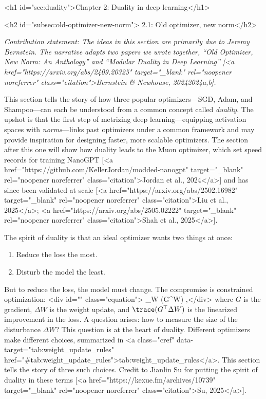 <h1 id="sec:duality">Chapter 2: Duality in deep learning</h1>

<h2 id="subsec:old-optimizer-new-norm"> 2.1: Old optimizer, new norm</h2>

\textit{Contribution statement: The ideas in this section are primarily due to Jeremy Bernstein. The narrative adapts two papers we wrote together, “Old Optimizer, New Norm: An Anthology” and “Modular Duality in Deep Learning” [<a href="https://arxiv.org/abs/2409.20325" target="_blank" rel="noopener noreferrer" class="citation">Bernstein & Newhouse, 20242024a,b].}

\vspace{1em}

This section tells the story of how three popular optimizers---SGD, Adam, and Shampoo---can each be understood from a common concept called \textit{duality}. The upshot is that the first step of metrizing deep learning---equipping activation spaces with \textit{norms}---links past optimizers under a common framework and may provide inspiration for designing faster, more scalable optimizers. The section after this one will show how duality leads to the Muon optimizer, which set speed records for training NanoGPT [<a href="https://github.com/KellerJordan/modded-nanogpt" target="_blank" rel="noopener noreferrer" class="citation">Jordan et al., 2024</a>] and has since been validated at scale [<a href="https://arxiv.org/abs/2502.16982" target="_blank" rel="noopener noreferrer" class="citation">Liu et al., 2025</a>; <a href="https://arxiv.org/abs/2505.02222" target="_blank" rel="noopener noreferrer" class="citation">Shah et al., 2025</a>].

The spirit of duality is that an ideal optimizer wants two things at once:
\begin{enumerate}
    \item Reduce the loss the most.
    \item Disturb the model the least.
\end{enumerate}
But to reduce the loss, the model must change. The compromise is constrained optimization:
<div id="" class="equation">    \argmin_{\Delta W} \; \trace(G^\top \Delta W) \;  \;  \leq \eta,</div> where $G$ is the gradient, $\Delta W$ is the weight update, and $\trace(G^\top \Delta W)$ is the linearized improvement in the loss. A question arises: how to measure the size of the disturbance $\Delta W$? This question is at the heart of duality. Different optimizers make different choices, summarized in <a class="cref" data-target="tab:weight_update_rules" href="#tab:weight_update_rules">tab:weight_update_rules</a>. This section tells the story of three such choices. Credit to Jianlin Su for putting the spirit of duality in these terms [<a href="https://kexue.fm/archives/10739" target="_blank" rel="noopener noreferrer" class="citation">Su, 2025</a>].

